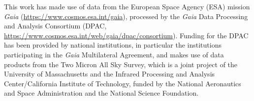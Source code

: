 \documentclass[baaa]{baaa}
\begin{document}
\begin{acknowledgement}
This work has made use of data from the European Space Agency (ESA) mission {\it Gaia} (\url{https://www.cosmos.esa.int/gaia}), processed by the {\it Gaia} Data Processing and Analysis Consortium (DPAC, \url{https://www.cosmos.esa.int/web/gaia/dpac/consortium}). Funding for the DPAC has been provided by national institutions, in particular the institutions participating in the {\it Gaia} Multilateral Agreement, and makes use of data products from the Two Micron All Sky Survey, which is a joint project of the University of Massachusetts and the Infrared Processing and Analysis Center/California Institute of Technology, funded by the National Aeronautics and Space Administration and the National Science Foundation.
\end{acknowledgement}



\small

 
\end{document}
